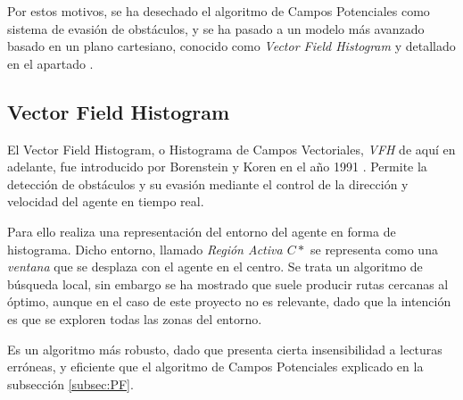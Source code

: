 Por estos motivos, se ha desechado el algoritmo de Campos Potenciales como sistema de evasión de obstáculos, y se ha pasado a un modelo más avanzado basado en un plano cartesiano, conocido como \textit{Vector Field Histogram} y detallado en el apartado . 

\subsection{Vector Field Histogram}
\label{subsec:VFH}
El Vector Field Histogram, o Histograma de Campos Vectoriales, \textit{VFH} de aquí en adelante, fue introducido por Borenstein y Koren en el año 1991 \citep{art:BorensteinKorenVFH, art:BorensteinKorenFMCE}. Permite la detección de obstáculos y su evasión mediante el control de la dirección y velocidad del agente en tiempo 
real.

Para ello realiza una representación del entorno del agente en forma de histograma. Dicho entorno, llamado \textit{Región Activa $C*$} se representa como una \textit{ventana} que se desplaza con el agente en el centro. Se trata un algoritmo de búsqueda local, sin embargo se ha mostrado que suele producir rutas cercanas al óptimo, aunque en el caso de este proyecto no es relevante, dado que la intención es que se exploren todas las zonas del entorno.

Es un algoritmo más robusto, dado que presenta cierta insensibilidad a lecturas erróneas, y eficiente que el algoritmo de Campos Potenciales explicado en la subsección \ref{subsec:PF}. 

